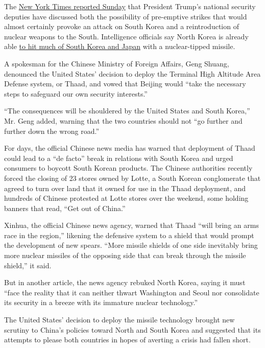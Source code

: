 The
\href{https://www.nytimes.com/2017/03/04/world/asia/north-korea-missile-program-sabotage.html}{New
York Times reported Sunday} that President Trump's national security
deputies have discussed both the possibility of pre-emptive strikes that
would almost certainly provoke an attack on South Korea and a
reintroduction of nuclear weapons to the South. Intelligence officials
say North Korea is already able
\href{https://www.nytimes.com/2016/05/07/world/asia/north-korea-nuclear-us-strategy.html}{to
hit much of South Korea and Japan} with a nuclear-tipped missile.

A spokesman for the Chinese Ministry of Foreign Affairs, Geng Shuang,
denounced the United States' decision to deploy the Terminal High
Altitude Area Defense system, or Thaad, and vowed that Beijing would
``take the necessary steps to safeguard our own security interests.''

``The consequences will be shouldered by the United States and South
Korea,'' Mr. Geng added, warning that the two countries should not ``go
further and further down the wrong road.''

For days, the official Chinese news media has warned that deployment of
Thaad could lead to a ``de facto'' break in relations with South Korea
and urged consumers to boycott South Korean products. The Chinese
authorities recently forced the closing of 23 stores owned by Lotte, a
South Korean conglomerate that agreed to turn over land that it owned
for use in the Thaad deployment, and hundreds of Chinese protested at
Lotte stores over the weekend, some holding banners that read, ``Get out
of China.''

Xinhua, the official Chinese news agency, warned that Thaad ``will bring
an arms race in the region,'' likening the defensive system to a shield
that would prompt the development of new spears. ``More missile shields
of one side inevitably bring more nuclear missiles of the opposing side
that can break through the missile shield,'' it said.

But in another article, the news agency rebuked North Korea, saying it
must ``face the reality that it can neither thwart Washington and Seoul
nor consolidate its security in a breeze with its immature nuclear
technology.''

The United States' decision to deploy the missile technology brought new
scrutiny to China's policies toward North and South Korea and suggested
that its attempts to please both countries in hopes of averting a crisis
had fallen short.


